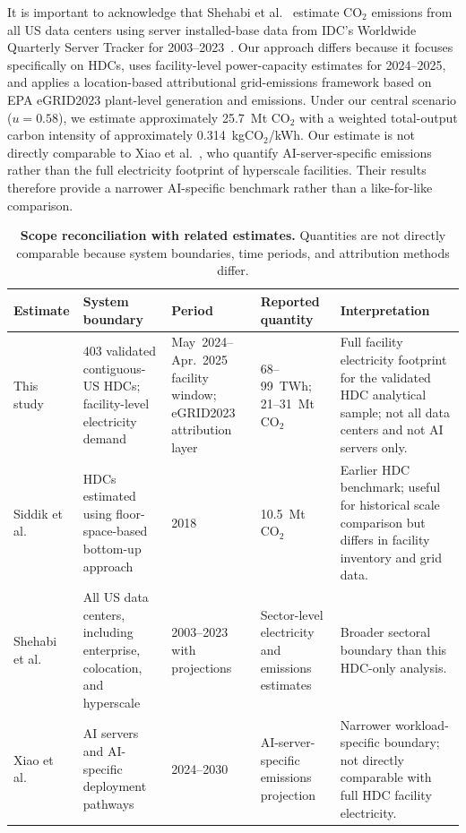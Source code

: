 \documentclass[12pt]{article}
\begin{document}
It is important to acknowledge that Shehabi et al.~\cite{Shehabi2024DataCenter} estimate CO$_2$ emissions from all US data centers using server installed-base data from IDC's Worldwide Quarterly Server Tracker for 2003--2023~\cite{idc2023a,idc2023b}. Our approach differs because it focuses specifically on HDCs, uses facility-level power-capacity estimates for 2024--2025, and applies a location-based attributional grid-emissions framework based on EPA eGRID2023 plant-level generation and emissions. Under our central scenario ($u=0.58$), we estimate approximately 25.7~Mt CO$_2$ with a weighted total-output carbon intensity of approximately 0.314~kgCO$_2$/kWh. Our estimate is not directly comparable to Xiao et al.~\cite{xiao2025environmental}, who quantify AI-server-specific emissions rather than the full electricity footprint of hyperscale facilities. Their results therefore provide a narrower AI-specific benchmark rather than a like-for-like comparison.

\begin{table}[htbp]
\centering
\small
\caption{\textbf{Scope reconciliation with related estimates.} Quantities are not directly comparable because system boundaries, time periods, and attribution methods differ.}
\label{tab:scope_reconciliation}
\begin{tabularx}{\textwidth}{p{2.7cm}p{3.2cm}p{2.2cm}p{3.0cm}X}
\toprule
\textbf{Estimate} & \textbf{System boundary} & \textbf{Period} & \textbf{Reported quantity} & \textbf{Interpretation} \\
\midrule
This study & 403 validated contiguous-US HDCs; facility-level electricity demand & May~2024--Apr.~2025 facility window; eGRID2023 attribution layer & 68--99~TWh; 21--31~Mt CO$_2$ & Full facility electricity footprint for the validated HDC analytical sample; not all data centers and not AI servers only. \\
Siddik et al.~\cite{siddik2021environmental} & HDCs estimated using floor-space-based bottom-up approach & 2018 & 10.5~Mt CO$_2$ & Earlier HDC benchmark; useful for historical scale comparison but differs in facility inventory and grid data. \\
Shehabi et al.~\cite{Shehabi2024DataCenter} & All US data centers, including enterprise, colocation, and hyperscale & 2003--2023 with projections & Sector-level electricity and emissions estimates & Broader sectoral boundary than this HDC-only analysis. \\
Xiao et al.~\cite{xiao2025environmental} & AI servers and AI-specific deployment pathways & 2024--2030 & AI-server-specific emissions projection & Narrower workload-specific boundary; not directly comparable with full HDC facility electricity. \\
\bottomrule
\end{tabularx}
\end{table}
\end{document}
